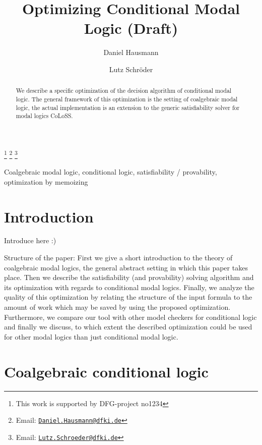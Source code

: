 \documentclass{entcs} \usepackage{entcsmacro}
\begin{document}
\begin{frontmatter}
  \title{Optimizing Conditional Modal Logic (Draft)}
  \author[Bremen]{Daniel Hausmann}
  \author[Bremen]{Lutz Schr\"oder }
  \address[Bremen]{Deutsches Zentrum f\"ur k\"unstliche Intelligenz (DFKI)\\ Universit\"at Bremen, Germany}
  \thanks[ALL]{This work is supported by DFG-project no1234}
  \thanks[myemail]{Email: \href{mailto:Daniel.Hausmann@dfki.de} {\texttt{\normalshape Daniel.Hausmann@dfki.de}}}
  \thanks[coemail]{Email: \href{mailto:Lutz.Schroeder@dfki.de} {\texttt{\normalshape Lutz.Schroeder@dfki.de}}}
\begin{abstract} 
  We describe a specific optimization of the decision algorithm
of conditional modal logic. The general framework
  of this optimization is the setting of coalgebraic modal logic,
the actual implementation is an extension to
  the generic satisfiability solver for modal logics CoLoSS.
\end{abstract}
\begin{keyword}
  Coalgebraic modal logic, conditional logic,
satisfiability / provability, optimization by memoizing
\end{keyword}
\end{frontmatter}
\section{Introduction}\label{intro}

Introduce here :)

Structure of the paper: First we give a short introduction to
the theory of coalgebraic modal logics, the general abstract
setting in which this paper takes place. Then we describe the
satisfiability (and provability) solving algorithm and its
optimization with regards to conditional modal logics. Finally, we 
analyze the quality of this optimization by relating
the structure of the input formula to the amount of work which may
be saved by using the proposed optimization. Furthermore,
we compare our tool with other model checkers for conditional logic
and finally we discuss, to which extent the described
optimization could be used for other modal logics than just
conditional modal logic.
 
\section{Coalgebraic conditional logic}
\end{document}
